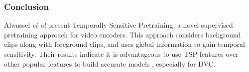 \subsubsection{Conclusion}
Alwassel \textit{et al} present Temporally Sensitive Pretraining, a novel supervised pretraining approach for video encoders. This approach considers background clips along with foreground clips, and uses global information to gain temporal sensitivity. Their results indicate it is advantageous to use TSP features over other popular features to build accurate models \cite{alwassel2021tsp}, especially for DVC.